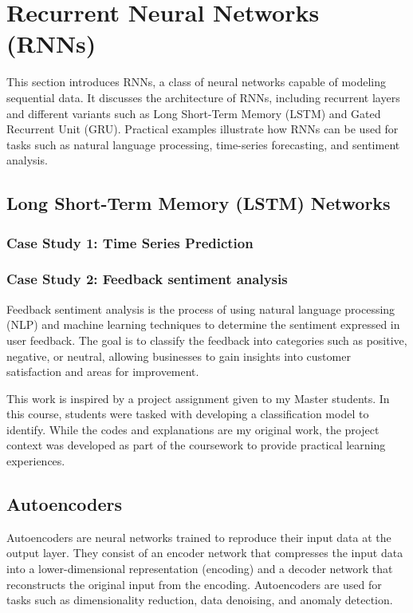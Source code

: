 \chapter{Recurrent Neural Networks (RNNs)}\label{sec:RNN}
This section introduces RNNs, a class of neural networks capable of modeling sequential data. It discusses the architecture of RNNs, including recurrent layers and different variants such as Long Short-Term Memory (LSTM) and Gated Recurrent Unit (GRU). Practical examples illustrate how RNNs can be used for tasks such as natural language processing, time-series forecasting, and sentiment analysis. 

\section{Long Short-Term Memory (LSTM) Networks}

\subsection{Case Study 1: Time Series Prediction}

\subsection{Case Study 2: Feedback sentiment analysis}

Feedback sentiment analysis is the process of using natural language processing (NLP) and machine learning techniques to determine the sentiment expressed in user feedback. The goal is to classify the feedback into categories such as positive, negative, or neutral, allowing businesses to gain insights into customer satisfaction and areas for improvement.

\begin{remark}
This work is inspired by a project assignment given to my Master students. In this course, students were tasked with developing a classification model to identify. While the codes and explanations are my original work, the project context was developed as part of the coursework to provide practical learning experiences.
\end{remark}

\section{Autoencoders}\label{sec:autoencoder}
Autoencoders are neural networks trained to reproduce their input data at the output layer. They consist of an encoder network that compresses the input data into a lower-dimensional representation (encoding) and a decoder network that reconstructs the original input from the encoding. Autoencoders are used for tasks such as dimensionality reduction, data denoising, and anomaly detection.

